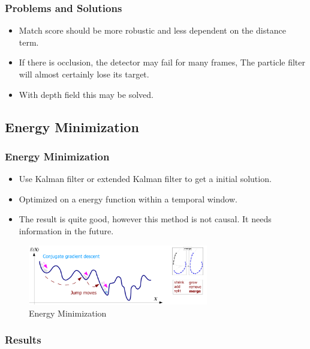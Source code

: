 \documentclass{beamer}
\begin{document}
\begin{frame}
	\frametitle{Problems and Solutions}
	\begin{itemize}
		\item Match score should be more robustic and less dependent on the distance term.
		\item If there is occlusion, the detector may fail for many frames, The particle filter will almost certainly lose its target.
		\item With depth field this may be solved.
	\end{itemize}
\end{frame}

\subsection{Energy Minimization}
\begin{frame}
	\frametitle{Energy Minimization}
	\begin{itemize}
		\item Use Kalman filter or extended Kalman filter to get a initial solution.
		\item Optimized on a energy function within a temporal window.
		\item The result is quite good, however this method is not causal. It needs information in the future.
	\end{itemize}
	\begin{figure}
		\begin{center}
			\includegraphics[width=0.7\textwidth]{images/energy.png}
			\caption{Energy Minimization}
		\end{center}
	\end{figure}
\end{frame}

\begin{frame}
	\frametitle{Results}
	\begin{center}
	\end{center}
\end{frame}
\end{document}
